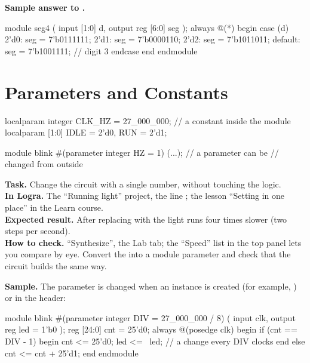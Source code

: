 \textbf{Sample answer to .}\par\nopagebreak
\begin{vcode}
module seg4 (
    input      [1:0] d,
    output reg [6:0] seg
);
    always @(*) begin
        case (d)
            2'd0:    seg = 7'b0111111;
            2'd1:    seg = 7'b0000110;
            2'd2:    seg = 7'b1011011;
            default: seg = 7'b1001111;   // digit 3
        endcase
    end
endmodule
\end{vcode}


\section{Parameters and Constants}

\begin{vcode}
localparam integer CLK_HZ = 27_000_000;  // a constant inside the module
localparam [1:0]   IDLE = 2'd0, RUN = 2'd1;

module blink #(parameter integer HZ = 1) (...);  // a parameter can be
                                                 // changed from outside
\end{vcode}

\begin{diybox}
\textbf{Task.} Change the circuit with a single number, without touching the logic.\\
\textbf{In Logra.} The ``Running light'' project, the line ; the lesson ``Setting in one place'' in the Learn course.\\
\textbf{Expected result.} After replacing  with  the light runs four times slower (two steps per second).\\
\textbf{How to check.} ``Synthesize'', the Lab tab; the ``Speed'' list in the top panel lets you compare by eye.  Convert the  into a module parameter  and check that the circuit builds the same way.
\end{diybox}

\textbf{Sample.} The parameter  is changed when an instance is created
(for example,  ) or in the header:
\begin{vcode}
module blink #(parameter integer DIV = 27_000_000 / 8) (
    input      clk,
    output reg led = 1'b0
);
    reg [24:0] cnt = 25'd0;
    always @(posedge clk) begin
        if (cnt == DIV - 1) begin
            cnt <= 25'd0;
            led <= ~led;                // a change every DIV clocks
        end else cnt <= cnt + 25'd1;
    end
endmodule
\end{vcode}


